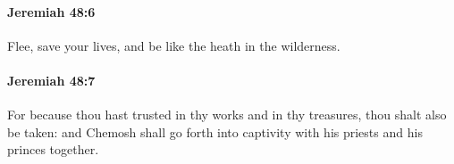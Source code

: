 		\paragraph{Jeremiah 48:6} %
			\label{JEREMIAH-48-6}

			Flee, save your lives, and be like the heath in the wilderness.


		\paragraph{Jeremiah 48:7} %
			\label{JEREMIAH-48-7}

			For because thou hast trusted in thy works and in thy treasures, thou shalt also be taken: and Chemosh shall go forth into captivity with his priests and his princes together.


